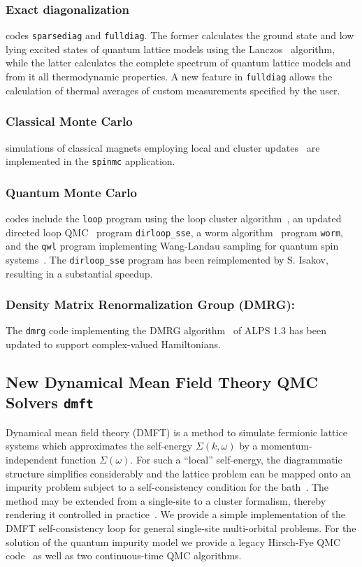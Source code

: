 \documentclass[12pt]{iopart}
\begin{document}
\subsubsection{Exact diagonalization}
codes {\tt sparsediag} and {\tt fulldiag}. The former calculates the ground state
and low lying excited states of quantum lattice models using the
Lanczos~\cite{lanczos} algorithm, while the latter calculates the complete
spectrum of quantum lattice models and from it all thermodynamic
properties. A new feature in {\tt fulldiag} allows the calculation of thermal averages of custom measurements specified by the user.



\subsubsection{Classical Monte Carlo} 
simulations of classical magnets employing local and cluster
updates~\cite{Swendsen87} are implemented in the {\tt spinmc} application.

\subsubsection{Quantum Monte Carlo} codes include the {\tt loop} program using the loop cluster
algorithm~\cite{Evertz03,Todo01,looper}, an updated directed loop QMC~\cite{Sylyuasen,Alet2005} program {\tt dirloop\_sse}, a worm algorithm~\cite{Prokofev98A} program {\tt worm}, and the {\tt qwl} program implementing Wang-Landau sampling for quantum spin systems~\cite{Troyer03}. The {\tt dirloop\_sse} program has been reimplemented by S. Isakov, resulting in a substantial speedup.

 
\subsubsection{Density Matrix Renormalization Group (DMRG):} The {\tt dmrg} code implementing the DMRG algorithm~\cite{White1992,Schollwock2005} of ALPS 1.3 has been updated to support complex-valued Hamiltonians.

\subsection{New Dynamical Mean Field Theory QMC Solvers {\tt dmft}}
Dynamical mean field theory (DMFT) is a method to simulate fermionic lattice systems which approximates the self-energy $\Sigma(k,\omega)$ by a momentum-independent 
function $\Sigma(\omega)$. For such a ``local'' self-energy, the diagrammatic structure simplifies considerably and the lattice problem can be mapped onto an impurity problem subject to a self-consistency condition for the bath~\cite{Georges96,Kotliar06}. The method may be extended from a single-site to a cluster formalism, thereby rendering it controlled in practice~\cite{Maier05}.
We provide a simple implementation of the DMFT self-consistency loop for general single-site multi-orbital problems.
For the solution of the quantum impurity model we provide a legacy Hirsch-Fye QMC code~\cite{Hirsch86} as well as two continuous-time QMC algorithms.
\end{document}
